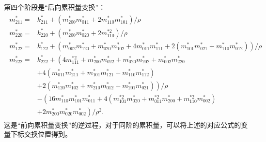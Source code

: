 第四个阶段是“后向累积量变换”：
\begin{align}
    \begin{split}
m_{211}^{*}= & k_{211}^{*}+\left(m_{200}^{*} m_{011}^{*}+2 m_{110}^{*} m_{101}^{*}\right) / \rho \\
m_{220}^{*}= & k_{220}^{*}+\left(m_{200}^{*} m_{020}^{*}+2 m_{110}^{* 2}\right) / \rho \\
m_{122}^{*}= & k_{122}^{*}+\left(m_{002}^{*} m_{120}^{*}+m_{020}^{*} m_{102}^{*}+4 m_{011}^{*} m_{111}^{*}+2\left(m_{101}^{*} m_{021}^{*}+m_{110}^{*} m_{012}^{*}\right)\right) / \rho \\
m_{222}^{*}= & k_{222}^{*}+\left(4 m_{111}^{* 2}+m_{200}^{*} m_{022}^{*}+m_{020}^{*} m_{202}^{*}+m_{002}^{*} m_{220}^{*}\right. \\
& +4\left(m_{011}^{*} m_{211}^{*}+m_{101}^{*} m_{121}^{*}+m_{110}^{*} m_{112}^{*}\right) \\
& \left.+2\left(m_{120}^{*} m_{102}^{*}+m_{210}^{*} m_{012}^{*}+m_{201}^{*} m_{021}^{*}\right)\right) / \rho \\
& -\left(16 m_{110}^{*} m_{101}^{*} m_{011}^{*}+4\left(m_{101}^{* 2} m_{020}^{*}+m_{011}^{* 2} m_{200}^{*}+m_{110}^{* 2} m_{002}^{*}\right)\right. \\
& \left.+2 m_{200}^{*} m_{020}^{*} m_{002}^{*}\right) / \rho^{2} .
\end{split}
\end{align}
这是“前向累积量变换”的逆过程，对于同阶的累积量，可以将上述的对应公式的变量下标交换位置得到。

